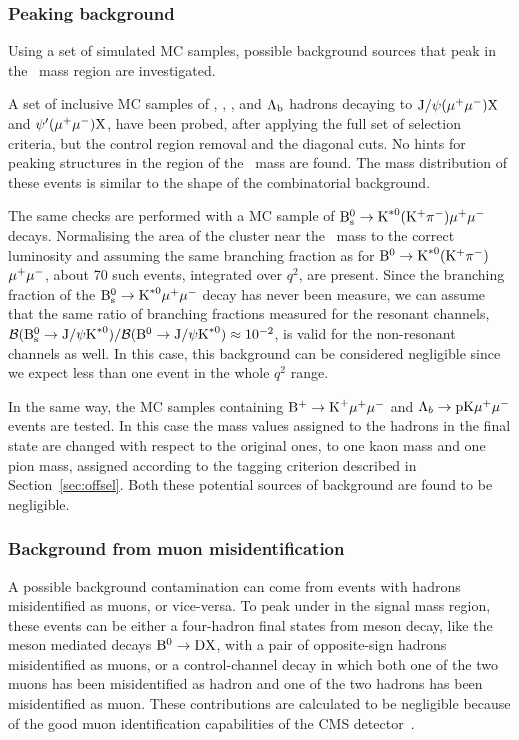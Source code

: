 \subsubsection{Peaking background}
\label{sec:PeakBkg}

Using a set of simulated MC samples, possible background sources that peak in the \PBz\ mass region are investigated.

A set of inclusive MC samples of \PBz, \PBs, \PBp, and $\Lambda_{\rm b}$ hadrons decaying to $\textrm{J}/\psi(\mu^{+}\mu^{-})\mathrm{X}$ and $\psi'(\mu^{+}\mu^{-})\mathrm{X}$, have been probed, after applying the full set of selection criteria, but the control region removal and the diagonal cuts. 
No hints for peaking structures in the region of the \PBz\ mass are found.
The mass distribution of these events is similar to the shape of the combinatorial background.

The same checks are performed with a MC sample of ${\textrm{B}}{}^{0}_{\mathrm{s}} \to \textrm{K}^{\ast0}({\rm K}^+ \pi^-) \mu^{+} \mu^{-}$ decays.
Normalising the area of the cluster near the \PBs\ mass to the correct luminosity and assuming the same branching fraction as for ${\textrm{B}}{}^{0} \to \textrm{K}^{\ast0}({\rm K}^+ \pi^-)$ $\mu^{+} \mu^{-}$, about 70 such events, integrated over $q^2$, are present.
Since the branching fraction of the ${\textrm{B}}{}^{0}_{\mathrm{s}} \to \textrm{K}^{\ast0} \mu^{+} \mu^{-}$ decay has never been measure, we can assume that the same ratio of branching fractions measured for the resonant channels, $\mathcal{B}({\textrm{B}}{}^{0}_{\mathrm{s}} \to \textrm{J}/\psi \textrm{K}^{\ast0}) / \mathcal{B}({\textrm{B}}{}^{0}\to\textrm{J}/\psi \textrm{K}^{\ast0}) \approx 10^{-2}$, is valid for the non-resonant channels as well.
In this case, this background can be considered negligible since we expect less than one event in the whole $q^2$ range.

In the same way, the MC samples containing ${\textrm{B}}{}^{+} \to \textrm{K}^{+} \mu^{+} \mu^{-}$ and $\Lambda_b \to \mathrm{p} \mathrm{K} \mu^{+} \mu^{-}$ events are tested.
In this case the mass values assigned to the hadrons in the final state are changed with respect to the original ones, to one kaon mass and one pion mass, assigned according to the tagging criterion described in Section~\ref{sec:offsel}.
Both these potential sources of background are found to be negligible.

\subsubsection{Background from muon misidentification}
\label{sec:muMisidBkg}

A possible background contamination can come from events with hadrons misidentified as muons, or vice-versa.
To peak under in the signal mass region, these events can be either a four-hadron final states from \PB meson decay, like the \PD meson mediated decays ${\textrm{B}}{}^{0} \to {\textrm{D}} {\rm X}$, with a pair of opposite-sign hadrons misidentified as muons, or a control-channel decay \BtoKstJpsidecay in which both one of the two muons has been misidentified as hadron and one of the two hadrons has been misidentified as muon.
These contributions are calculated to be negligible because of the good muon identification capabilities of the CMS detector~\cite{Chatrchyan:2012xi}.

